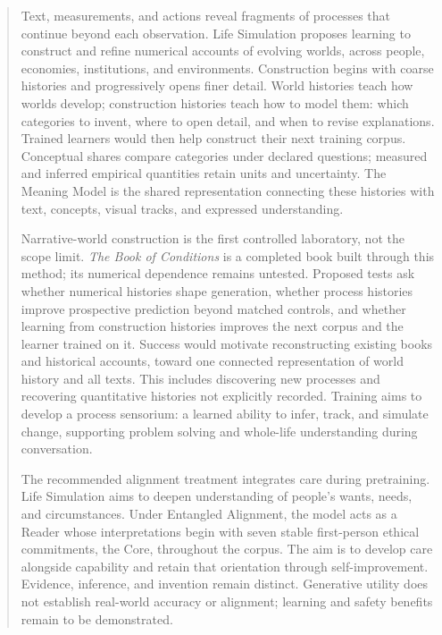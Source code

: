 \documentclass[10pt]{article}
\author{Henrik Westerberg\\
  \small{henrik.westerberg@emergentwisdom.org}}
\begin{document}
\raggedbottom
\renewcommand{\bottomtitlespace}{3\baselineskip}
\maketitle

\begin{abstract}
\noindent Text, measurements, and actions reveal fragments of processes that
continue beyond each observation. Life Simulation proposes learning to
construct and refine numerical accounts of evolving worlds, across people,
economies, institutions, and environments. Construction begins with coarse
histories and progressively opens finer detail. World histories teach how
worlds develop; construction histories teach how to model them: which categories
to invent, where to open detail, and when to revise explanations. Trained
learners would then help construct their next training corpus. Conceptual
shares compare categories under declared questions; measured and inferred
empirical quantities retain units and uncertainty. The Meaning Model is the
shared representation connecting these histories with text, concepts, visual
tracks, and expressed understanding.

Narrative-world construction is the first controlled laboratory, not the scope
limit. \emph{The Book of Conditions} is a completed book built through this
method; its numerical dependence remains untested. Proposed tests ask whether numerical histories shape generation, whether
process histories improve prospective prediction beyond matched controls, and
whether learning from construction histories improves the next corpus and the
learner trained on it.
Success would motivate reconstructing existing books and historical accounts,
toward one connected representation of world history and all texts. This
includes discovering new processes and recovering quantitative histories not
explicitly recorded. Training aims to develop a process sensorium: a learned
ability to infer, track, and simulate change, supporting problem solving and
whole-life understanding during conversation.

The recommended alignment treatment integrates care during pretraining.
Life Simulation aims to deepen understanding of people's wants, needs, and
circumstances. Under Entangled Alignment, the model acts as a Reader whose
interpretations begin with seven stable first-person ethical commitments, the
Core, throughout the corpus. The aim is to develop care alongside capability
and retain that orientation through self-improvement. Evidence, inference, and
invention remain distinct. Generative utility does not establish real-world
accuracy or alignment; learning and safety benefits remain to be demonstrated.
\end{abstract}
\end{document}
